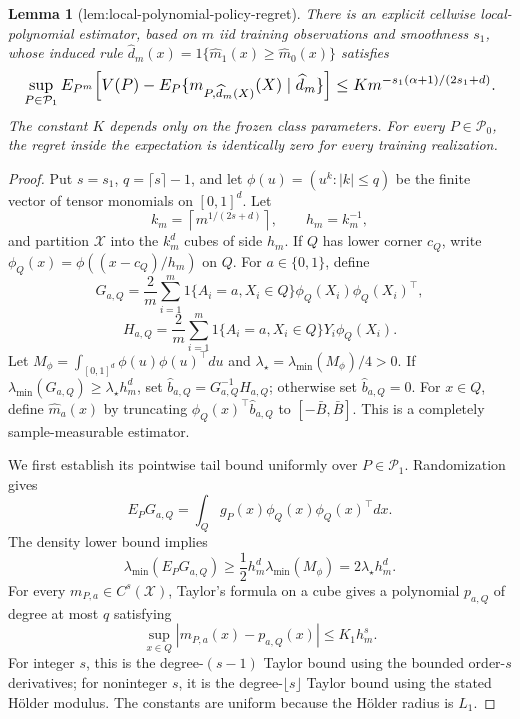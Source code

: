 \documentclass{article}
\newtheorem{lemma}{Lemma}
\begin{document}
\begin{lemma}[lem:local-polynomial-policy-regret]\label{lem:local-polynomial-policy-regret}
There is an explicit cellwise local-polynomial estimator, based on \(m\) iid training observations and smoothness \(s_1\), whose induced rule \(\widehat d_m(x)=1\{\widehat m_1(x)\ge\widehat m_0(x)\}\) satisfies
\[
\makebox[\linewidth][c]{\resizebox{0.98\linewidth}{!}{\(\displaystyle \sup_{P\in\mathcal P_1}E_{P^m}\!\left[V(P)-E_P\{m_{P,\widehat d_m(X)}(X)\mid\widehat d_m\}\right]
 \le K m^{-s_1(\alpha+1)/(2s_1+d)}.\)}}
\]
The constant \(K\) depends only on the frozen class parameters.  For every \(P\in\mathcal P_0\), the regret inside the expectation is identically zero for every training realization.
\end{lemma}
\begin{proof}
Put \(s=s_1\), \(q=\lceil s\rceil-1\), and let \(\phi(u)=(u^k:|k|\le q)\) be the finite vector of tensor monomials on \([0,1]^d\).  Let
\[
 k_m=\left\lceil m^{1/(2s+d)}\right\rceil,
 \qquad h_m=k_m^{-1},
\]
and partition \(\mathcal X\) into the \(k_m^d\) cubes of side \(h_m\).  If \(Q\) has lower corner \(c_Q\), write \(\phi_Q(x)=\phi((x-c_Q)/h_m)\) on \(Q\).  For \(a\in\{0,1\}\), define
\[
 G_{a,Q}=\frac2m\sum_{i=1}^m1\{A_i=a,X_i\in Q\}\phi_Q(X_i)\phi_Q(X_i)^\top,
\]
\[
 H_{a,Q}=\frac2m\sum_{i=1}^m1\{A_i=a,X_i\in Q\}Y_i\phi_Q(X_i).
\]
Let \(M_\phi=\int_{[0,1]^d}\phi(u)\phi(u)^\top du\) and \(\lambda_\star=\lambda_{\min}(M_\phi)/4>0\).  If \(\lambda_{\min}(G_{a,Q})\ge\lambda_\star h_m^d\), set \(\widehat b_{a,Q}=G_{a,Q}^{-1}H_{a,Q}\); otherwise set \(\widehat b_{a,Q}=0\).  For \(x\in Q\), define \(\widehat m_a(x)\) by truncating \(\phi_Q(x)^\top\widehat b_{a,Q}\) to \([-\bar B,\bar B]\).  This is a completely sample-measurable estimator.

We first establish its pointwise tail bound uniformly over \(P\in\mathcal P_1\).  Randomization gives
\[
 E_PG_{a,Q}=\int_Qg_P(x)\phi_Q(x)\phi_Q(x)^\top dx.
\]
The density lower bound implies
\[
 \lambda_{\min}(E_PG_{a,Q})
 \ge\frac12h_m^d\lambda_{\min}(M_\phi)
 =2\lambda_\star h_m^d.
\]
For every \(m_{P,a}\in C^s(\mathcal X)\), Taylor's formula on a cube gives a polynomial \(p_{a,Q}\) of degree at most \(q\) satisfying
\[
 \sup_{x\in Q}|m_{P,a}(x)-p_{a,Q}(x)|\le K_1h_m^s.
\]
For integer \(s\), this is the degree-\((s-1)\) Taylor bound using the bounded order-\(s\) derivatives; for noninteger \(s\), it is the degree-\(\lfloor s\rfloor\) Taylor bound using the stated Hölder modulus.  The constants are uniform because the Hölder radius is \(L_1\).


\end{proof}
\end{document}

